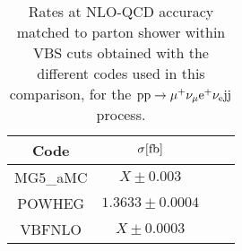  \begin{table}[h!]
    \centering
    \begin{tabular}{c|c|c|c}
        Code  &  $\sigma[\rm{fb}]$  \\
        \hline
        \hline
        {\sc MG5\_aMC}&  $X  \pm 0.003$  \\
        {\sc POWHEG}  &  $1.3633 \pm 0.0004$  \\
        {\sc VBFNLO}  &  $X \pm 0.0003$  \\
    \end{tabular}
    \caption{\label{tab:wg1_NLOrates} Rates at NLO-QCD accuracy matched to parton shower within VBS cuts obtained with the different codes used in this comparison, 
    for the ${\rm p}{\rm p}\to\mu^+\nu_\mu{\rm e}^+\nu_{\rm e}{\rm j}{\rm j}$ process.}
\end{table}